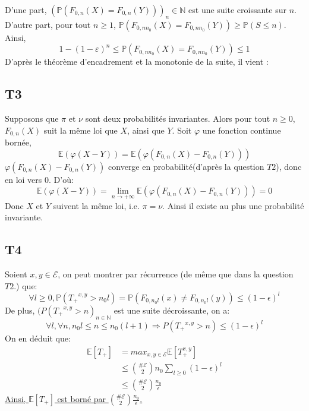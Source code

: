 \documentclass[a4paper,11pt]{article}
\def \P{\mathbb{P}}
\def \E{\mathcal{E}}
\begin{document}
\begin{center}
\end{center}


D'une part, $(\mathbb{P}(F_{0,n}(X)=F_{0,n}(Y)))_n\in \mathbb{N}$ est une suite croissante sur $n$.\\
D'autre part, pour tout $n\geq 1$, $\mathbb{P}(F_{0,nn_0}(X)=F_{0,nn_0}(Y))\geq\mathbb{P}(S\leq n)$.\\
Ainsi,
\[1-(1-\varepsilon)^n\leq\mathbb{P}(F_{0,nn_0}(X)=F_{0,nn_0}(Y))\leq1\]
D'après le théorème d'encadrement et la monotonie de la suite, il vient :

\begin{center}
\end{center}


\subsection*{T3}
Supposons que $\pi$ et $\nu$ sont deux probabilités invariantes. 
Alors pour tout $n\geq0$, $F_{0,n}(X)$ suit la même loi que $X$, ainsi que $Y$.
Soit $\varphi$ une fonction continue bornée,
\[\mathbb{E}(\varphi(X-Y))=\mathbb{E}(\varphi(F_{0,n}(X)-F_{0,n}(Y)))\]
$\varphi(F_{0,n}(X)-F_{0,n}(Y))$ converge en probabilité(d'après la question $T2$), donc en loi vers $0$.
D'où:
\[\mathbb{E}(\varphi(X-Y))=\lim \limits_{n \rightarrow +\infty}\mathbb{E}(\varphi(F_{0,n}(X)-F_{0,n}(Y)))=0\]
Donc $X$ et $Y$ suivent la même loi, i.e. $\pi = \nu$.
Ainsi il existe au plus une probabilité invariante.

\subsection*{T4}
Soient $x,y \in \E$, on peut montrer par récurrence (de même que dans la question $T2.$) que:
\[\forall l\geq 0, \P({T_+}^{x,y}>n_0l)=\P(F_{0,n_0l}(x)\ne F_{0,n_0l}(y))\leq (1-\epsilon)^l\]
De plus, $(P({T_+}^{x,y}>n)_{n \in \mathbb{N}}$ est une suite décroissante, on a:
\[\forall l, \forall n, n_0l\leq n \leq n_0(l+1) \Rightarrow P({T_+}^{x,y}>n) \leq (1-\epsilon)^l \]
On en déduit que:
\begin{equation*}
\begin{split}
\mathbb{E}[T_+] &=max_{x,y \in \E} \mathbb{E}[T_+^{x,y}] \\
&\leq \binom{\# \E}{2} n_0 \sum_{l\geq 0} (1-\epsilon)^l \\
&\leq \binom{\# \E}{2} \frac{n_0}{\epsilon}
\end{split}
\end{equation*}
\underline{Ainsi, $\mathbb{E}[T_+]$ est borné par $\binom{\# \E}{2} \frac{n_0}{\epsilon}$.}
\end{document}
